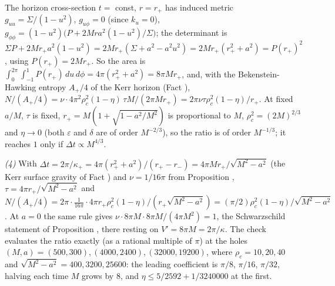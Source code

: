 The horizon cross-section $t = $ const, $r = r_+$ has induced metric $g_{uu} = \Sigma/(1 - u^2)$, $g_{u\phi} = 0$ (since $k_u = 0$), $g_{\phi\phi} = (1 - u^2)\bigl(P + 2Mra^2(1 - u^2)/\Sigma\bigr)$; the determinant is $\Sigma P + 2Mr_+a^2(1 - u^2) = 2Mr_+(\Sigma + a^2 - a^2u^2) = 2Mr_+(r_+^2 + a^2) = P(r_+)^2$, using $P(r_+) = 2Mr_+$. So the area is $\int_0^{2\pi}\!\int_{-1}^{1}P(r_+)\,du\,d\phi = 4\pi(r_+^2 + a^2) = 8\pi Mr_+$, and, with the Bekenstein-Hawking entropy $A_+/4$ of the Kerr horizon (Fact ), $N/(A_+/4) = \nu\cdot 4\pi^2\rho_c^2(1 - \eta)\,\tau M/(2\pi Mr_+) = 2\pi\nu\tau\rho_c^2(1 - \eta)/r_+$. At fixed $a/M$, $\tau$ is fixed, $r_+ = M(1 + \sqrt{1 - a^2/M^2})$ is proportional to $M$, $\rho_c^2 = (2M)^{2/3}$ and $\eta \to 0$ (both $\varepsilon$ and $\delta$ are of order $M^{-2/3}$), so the ratio is of order $M^{-1/3}$; it reaches $1$ only if $\Delta t \propto M^{4/3}$.

\emph{(4)} With $\Delta t = 2\pi/\kappa_+ = 4\pi(r_+^2 + a^2)/(r_+ - r_-) = 4\pi Mr_+/\sqrt{M^2 - a^2}$ (the Kerr surface gravity of Fact ) and $\nu = 1/16\pi$ from Proposition , $\tau = 4\pi r_+/\sqrt{M^2 - a^2}$ and $N/(A_+/4) = 2\pi\cdot\tfrac{1}{16\pi}\cdot 4\pi r_+\rho_c^2(1 - \eta)/(r_+\sqrt{M^2 - a^2}) = (\pi/2)\rho_c^2(1 - \eta)/\sqrt{M^2 - a^2}$. At $a = 0$ the same rule gives $\nu\cdot 8\pi M\cdot 8\pi M/(4\pi M^2) = 1$, the Schwarzschild statement of Proposition , there resting on $V' = 8\pi M = 2\pi/\kappa$. The check evaluates the ratio exactly (as a rational multiple of $\pi$) at the holes $(M, a) = (500, 300), (4000, 2400), (32000, 19200)$, where $\rho_c = 10, 20, 40$ and $\sqrt{M^2 - a^2} = 400, 3200, 25600$: the leading coefficient is $\pi/8$, $\pi/16$, $\pi/32$, halving each time $M$ grows by $8$, and $\eta \le 5/2592 + 1/3240000$ at the first.
